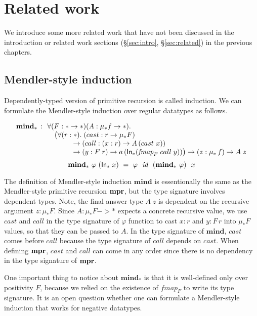 \chapter{Related work}\label{ch:relwork}
We introduce some more related work that have not been discussed
in the introduction or related work sections (\S\ref{sec:intro},
\S\ref{sec:related}) in the previous chapters.



\section{Mendler-style induction}
\label{sec:relwork:dep}
Dependently-typed version of primitive recursion is called induction.
We can formulate the Mendler-style induction over regular datatypes as follows.
\vspace*{-2em}
\begin{singlespace}
\[\begin{array}{ll}
\textbf{mind}_{*} \, :
& \!\!\forall (F:* -> *) (A: \mu_{*}f -> *). \\
& ~~ \big(\forall(r:*).\;(cast : r -> \mu_{*}F) \\
& ~\qquad\quad -> (call : (x:r) -> A\,(cast~x)) \\
& ~\qquad\quad -> (y: F\;r) -> a\,(\mathsf{In}_{*}(\textit{fmap}_{F}\;call\;y)) \big) 
-> (z:\mu_{*}\,f) -> A\;z
\end{array}
\]
\[
\textbf{mind}_{*} ~ \varphi ~ (\mathsf{In}_{*}\;x)
  ~=~ \varphi~~\textit{id}~~(\textbf{mind}_{*}~\varphi)~~x \]
\end{singlespace}\noindent
The definition of Mendler-style induction $\textbf{mind}$ is
essentionally the same as the Mendler-style primitive recursion $\mathbf{mpr}$,
but the type signature involves dependent types.
Note, the final answer type $A\;z$ is dependent on
the recursive argument $z:\mu_{*}F$.
Since $A: \mu_{*}F -> *$ expects a concrete recursive value,
we use $cast$ and $call$ in the type signature of $\varphi$ function
to cast $x:r$ and $y:F\,r$ into $\mu_{*}F$ values, so that
they can be passed to $A$.
In the type signature of $\textbf{mind}$, $cast$ comes before $call$
because the type signature of $call$ depends on $cast$.
When defining $\mathbf{mpr}$, $cast$ and $call$ can come in any order
since there is no dependency in the type signature of $\mathbf{mpr}$.

One important thing to notice about $\textbf{mind}_{*}$ is that
it is well-defined only over positivity $F$, because we relied on
the existence of $\textit{fmap}_F$ to write its type signature.
It is an open question whether one can formulate a Mendler-style induction
that works for negative datatypes.

